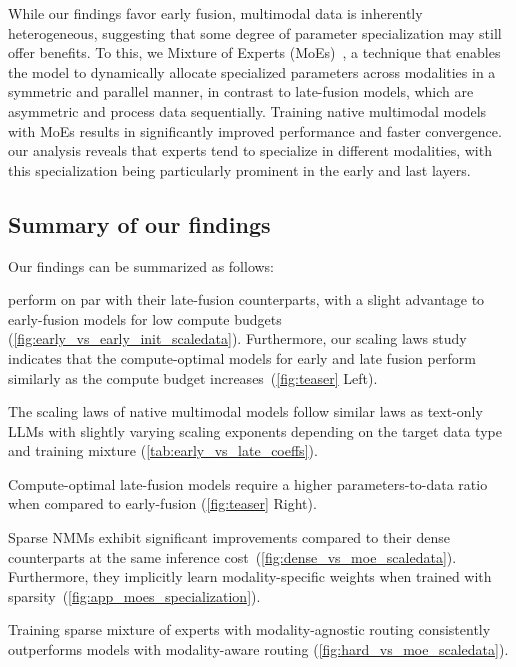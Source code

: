 While our findings favor early fusion, multimodal data is inherently
heterogeneous, suggesting that some degree of parameter specialization may still
offer benefits. To  this, we  Mixture
of Experts (MoEs)~\citep{shazeer2017outrageously}, a technique that enables the
model to dynamically allocate specialized parameters across modalities in a
symmetric and parallel manner, in contrast to late-fusion models, which are
asymmetric and process data sequentially. Training native multimodal models with
MoEs results in significantly improved performance and  faster
convergence.  our analysis reveals that experts tend to specialize in different modalities,
with this specialization being particularly prominent in the early and last
layers. 






\subsection{Summary of our findings}
Our findings can be summarized as follows:

 
perform on par with their late-fusion counterparts, with a
slight advantage to early-fusion models for low compute budgets
(\cref{fig:early_vs_early_init_scaledata}). Furthermore, our scaling laws study
indicates that the compute-optimal models for early and late fusion perform
similarly as the compute budget increases~(\cref{fig:teaser} Left).

 The scaling laws of native multimodal
models follow similar laws as text-only LLMs with slightly varying  scaling
exponents depending on the target data type and training mixture
(\cref{tab:early_vs_late_coeffs}).

Compute-optimal late-fusion models require a higher parameters-to-data ratio
when compared to early-fusion (\cref{fig:teaser} Right).

 Sparse NMMs exhibit
significant improvements compared to their dense counterparts at the same
inference cost~(\cref{fig:dense_vs_moe_scaledata}). Furthermore, they implicitly
learn modality-specific weights when trained with
sparsity~(\cref{fig:app_moes_specialization}). 

Training sparse mixture of experts with modality-agnostic routing consistently
outperforms models with modality-aware routing
(\cref{fig:hard_vs_moe_scaledata}).


\vspace{-5pt}




